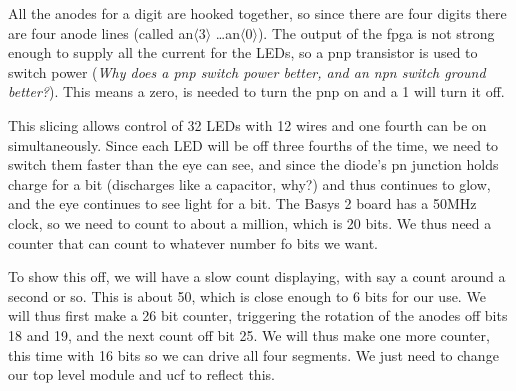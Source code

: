 
All the anodes for a digit are hooked together, so since there are four digits there are four anode lines (called an$\langle 3\rangle$ \ldots an$\langle 0\rangle$).  The output of the fpga is not strong enough to supply all the current for the LEDs, so a pnp transistor is used to switch power (\emph{Why does a pnp switch power better, and an npn switch ground better?}).  This means a zero, is needed to turn the pnp on and a 1 will turn it off.

This slicing allows control of 32 LEDs with 12 wires and one fourth can be on simultaneously.  Since each LED will be off three fourths of the time, we need to switch them faster than the eye can see, and since the diode's pn junction holds charge for a bit (discharges like a capacitor, why?) and thus continues to glow, and the eye continues to see light for a bit.  The Basys 2 board has a 50MHz clock, so we need to count to about a million, which is 20 bits.  We thus need a counter that can count to whatever number fo bits we want.


To show this off, we will have a slow count displaying, with say a count around a second or so.  This is about 50, which is close enough to 6 bits for our use.  We will thus first make a 26 bit counter, triggering the rotation of the anodes off bits 18 and 19, and the next count off bit 25.  We will thus make one more counter, this time with 16 bits so we can drive all four segments.  We just need to change our top level module and ucf to reflect this.

